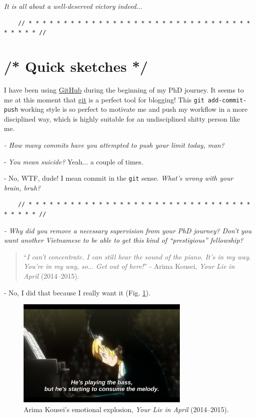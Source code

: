 \documentclass[12pt]{article}
\numberwithin{equation}{section}
\begin{document}
\textit{It is all about a well-deserved victory indeed}$\ldots$

\begin{verbatim}
    // * * * * * * * * * * * * * * * * * * * * * * * * * * * * * * * * * * * * * //
\end{verbatim}

\section{{\color{gray}/* Quick sketches */}}
 I have been using \href{https://github.com}{GitHub} during the beginning of my PhD journey. It seems to me at this moment that \href{https://git-scm.com/}{git} is a perfect tool for blogging! This \texttt{git add-commit-push} working style is so perfect to motivate me and push my workflow in a more disciplined way, which is highly suitable for an undisciplined shitty person like me.

\textit{- How many commits have you attempted to push your limit today, man?}

- \textit{You mean suicide?} Yeah$\ldots$ a couple of times.

- No, WTF, dude! I mean commit in the \texttt{git} sense. \textit{What's wrong with your brain, bruh?}

\begin{verbatim}
    // * * * * * * * * * * * * * * * * * * * * * * * * * * * * * * * * * * * * * //
\end{verbatim}

\noindent
{} \textit{- Why did you remove a necessary supervision from your PhD journey? Don't you want another Vietnamese to be able to get this kind of ``prestigious'' fellowship?}

\begin{quotation}
    ``\textit{I can't concentrate. I can still hear the sound of the piano. It's in my way. You're in my way, so$\ldots$ Get out of here!}'' - Arima Kousei, \textit{Your Lie in April}  (2014--2015).
\end{quotation}

- No, I did that because I really want it (Fig. \ref{fig4}).
\begin{figure}[h]
    \centering
    \includegraphics[width=0.75\textwidth]{Arima_Kousei_emotional_explosion}
    \caption{Arima Kousei's emotional explosion, \textit{Your Lie in April} (2014--2015).}
    \label{fig4}
\end{figure}
\end{document}
